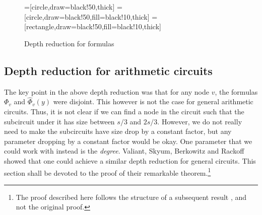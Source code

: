 \begin{figure}
\begin{center}
=[circle,draw=black!50,thick]
=[circle,draw=black!50,fill=black!10,thick]
=[rectangle,draw=black!50,fill=black!10,thick]
\end{center}
\caption{Depth reduction for formulas}
\label{fig:formula-depth-red}
\end{figure}

\subsection{Depth reduction for arithmetic circuits}

The key point in the above depth reduction was that for any node $v$, the formulas $\Phi_v$ and $\hat{\Phi}_v(y)$ were disjoint. This however is not the case for general arithmetic circuits. Thus, it is not clear if we can find a node in the circuit such that the subcircuit under it has size between $s/3$ and $2s/3$. However, we do not really need to make the subcircuits have size drop by a constant factor, but any parameter dropping by a constant factor would be okay. One parameter that we could work with instead is the \emph{degree}. Valiant, Skyum, Berkowitz and Rackoff \cite{vsbr83} showed that one could achieve a similar depth reduction for general circuits. This section shall be devoted to the proof of their remarkable theorem.\footnote{The proof described here follows the structure of a subsequent result \cite{ajmv98}, and not the original proof.}

